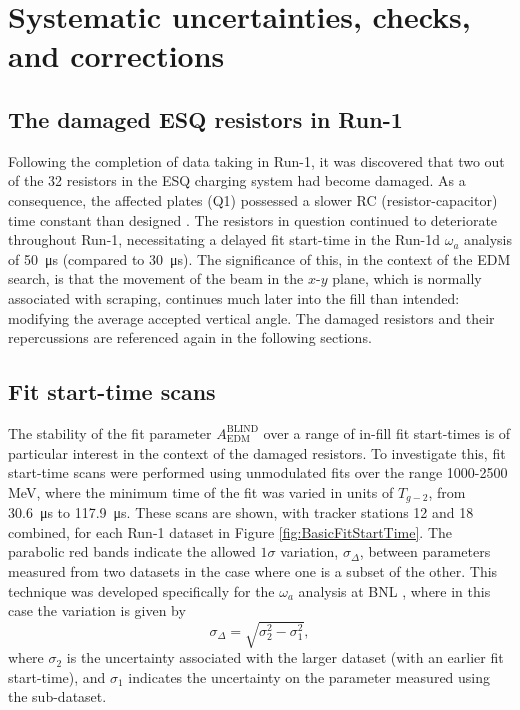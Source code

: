 \section{Systematic uncertainties, checks, and corrections}\label{sec:Run1Syst}


\subsection{The damaged ESQ resistors in Run-1}

Following the completion of data taking in Run-1, it was discovered that two out of the 32 resistors in the ESQ charging system had become damaged. As a consequence, the affected plates (Q1) possessed a slower RC (resistor-capacitor) time constant than designed \cite{OmegaARun1}\cite{BeamDynamics}. The resistors in question continued to deteriorate throughout Run-1, necessitating a delayed fit start-time in the Run-1d $\omega_{a}$ analysis of \SI{50}{\micro\second} (compared to \SI{30}{\micro\second}). The significance of this, in the context of the EDM search, is that the movement of the beam in the $x$-$y$ plane, which is normally associated with scraping, continues much later into the fill than intended: modifying the average accepted vertical angle. The damaged resistors and their repercussions are referenced again in the following sections. %

\subsection{Fit start-time scans}\label{sec:FitStartTimeScans}

The stability of the fit parameter $A_{\text{EDM}}^{\text{BLIND}}$ over a range of in-fill fit start-times is of particular interest in the context of the damaged resistors. To investigate this, fit start-time scans were performed using unmodulated fits over the range 1000-2500 MeV, where the minimum time of the fit was varied in units of $T_{g-2}$, from \SI{30.6}{\micro\second} to \SI{117.9}{\micro\second}. These scans are shown, with tracker stations 12 and 18 combined, for each Run-1 dataset in Figure \ref{fig:BasicFitStartTime}. The parabolic red bands indicate the allowed $1\sigma$ variation, $\sigma_{\Delta}$, between parameters measured from two datasets in the case where one is a subset of the other. This technique was developed specifically for the $\omega_{a}$ analysis at BNL \cite{BNLFinalReport}, where in this case the variation is given by
%
\begin{equation}
  \sigma_{\Delta} = \sqrt{\sigma_{2}^{2} - \sigma_{1}^{2}},
  \label{eqn:Kawall}
\end{equation}
%
where $\sigma_{2}$ is the uncertainty associated with the larger dataset (with an earlier fit start-time), and $\sigma_{1}$ indicates the uncertainty on the parameter measured using the sub-dataset. 

